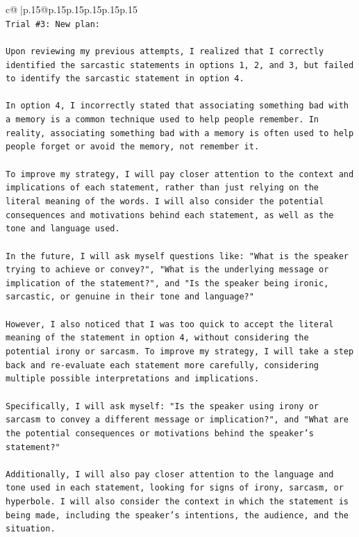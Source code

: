 \documentclass{article}
\begin{document}
{\begin{supertabular}{c@{$\;$}|p{.15\linewidth}@{}p{.15\linewidth}p{.15\linewidth}p{.15\linewidth}p{.15\linewidth}p{.15\linewidth}}
{{{\\ 
\texttt{Trial \#3: New plan: } \\
\\ 
\texttt{Upon reviewing my previous attempts, I realized that I correctly identified the sarcastic statements in options 1, 2, and 3, but failed to identify the sarcastic statement in option 4. } \\
\\ 
\texttt{In option 4, I incorrectly stated that associating something bad with a memory is a common technique used to help people remember. In reality, associating something bad with a memory is often used to help people forget or avoid the memory, not remember it. } \\
\\ 
\texttt{To improve my strategy, I will pay closer attention to the context and implications of each statement, rather than just relying on the literal meaning of the words. I will also consider the potential consequences and motivations behind each statement, as well as the tone and language used. } \\
\\ 
\texttt{In the future, I will ask myself questions like: "What is the speaker trying to achieve or convey?", "What is the underlying message or implication of the statement?", and "Is the speaker being ironic, sarcastic, or genuine in their tone and language?" } \\
\\ 
\texttt{However, I also noticed that I was too quick to accept the literal meaning of the statement in option 4, without considering the potential irony or sarcasm. To improve my strategy, I will take a step back and re{-}evaluate each statement more carefully, considering multiple possible interpretations and implications. } \\
\\ 
\texttt{Specifically, I will ask myself: "Is the speaker using irony or sarcasm to convey a different message or implication?", and "What are the potential consequences or motivations behind the speaker's statement?" } \\
\\ 
\texttt{Additionally, I will also pay closer attention to the language and tone used in each statement, looking for signs of irony, sarcasm, or hyperbole. I will also consider the context in which the statement is being made, including the speaker's intentions, the audience, and the situation. } \\
\\ 
}}}
\end{supertabular}}
\end{document}

